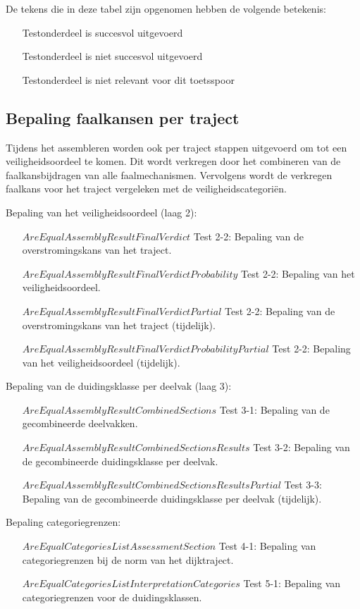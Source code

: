 De tekens die in deze tabel zijn opgenomen hebben de volgende betekenis:
\begin{itemize}
	\item [\cmark] Testonderdeel is succesvol uitgevoerd
	\item [\xmark] Testonderdeel is niet succesvol uitgevoerd
	\item [\nmark] Testonderdeel is niet relevant voor dit toetsspoor
\end{itemize}

\subsection{Bepaling faalkansen per traject}
	\label{sec:$Order$:pertraject}
Tijdens het assembleren worden ook per traject stappen uitgevoerd om tot een veiligheidsoordeel te komen. Dit wordt verkregen door het combineren van de faalkansbijdragen van alle faalmechanismen. Vervolgens wordt de verkregen faalkans voor het traject vergeleken met de veiligheidscategori\"en.

Bepaling van het veiligheidsoordeel (laag 2):
\begin{itemize}
	\item [$AreEqualAssemblyResultFinalVerdict$]Test 2-2: Bepaling van de overstromingskans van het traject.
	\item [$AreEqualAssemblyResultFinalVerdictProbability$]Test 2-2: Bepaling van het veiligheidsoordeel.
	\item [$AreEqualAssemblyResultFinalVerdictPartial$]Test 2-2: Bepaling van de overstromingskans van het traject (tijdelijk).
	\item [$AreEqualAssemblyResultFinalVerdictProbabilityPartial$]Test 2-2: Bepaling van het veiligheidsoordeel (tijdelijk).
\end{itemize}

Bepaling van de duidingsklasse per deelvak (laag 3):
\begin{itemize}
	\item [$AreEqualAssemblyResultCombinedSections$] Test 3-1: Bepaling van de gecombineerde deelvakken.
	\item [$AreEqualAssemblyResultCombinedSectionsResults$] Test 3-2: Bepaling van de gecombineerde duidingsklasse per deelvak.
	\item [$AreEqualAssemblyResultCombinedSectionsResultsPartial$] Test 3-3: Bepaling van de gecombineerde duidingsklasse per deelvak (tijdelijk).
\end{itemize}

Bepaling categoriegrenzen:
\begin{itemize}
	\item [$AreEqualCategoriesListAssessmentSection$]Test 4-1: Bepaling van categoriegrenzen bij de norm van het dijktraject.
	\item [$AreEqualCategoriesListInterpretationCategories$]Test 5-1: Bepaling van categoriegrenzen voor de duidingsklassen.
\end{itemize}
